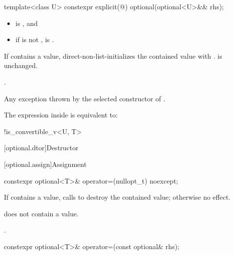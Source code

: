 %
\begin{itemdecl}
template<class U> constexpr explicit(@\seebelow@) optional(optional<U>&& rhs);
\end{itemdecl}

\begin{itemdescr}
\pnum
\constraints
\begin{itemize}
\item {} is , and
\item if  is not \cv{} ,
 is .
\end{itemize}

\pnum
\effects
If  contains a value,
direct-non-list-initializes the contained value with .
 is unchanged.

\pnum
\ensures
{}.

\pnum
\throws
Any exception thrown by the selected constructor of .

\pnum
\remarks
The expression inside  is equivalent to:
\begin{codeblock}
!is_convertible_v<U, T>
\end{codeblock}
\end{itemdescr}

[optional.dtor]{Destructor}

[optional.assign]{Assignment}

%
\begin{itemdecl}
constexpr optional<T>& operator=(nullopt_t) noexcept;
\end{itemdecl}

\begin{itemdescr}
\pnum
\effects
If  contains a value, calls  to destroy the contained value; otherwise no effect.

\pnum
\ensures
{} does not contain a value.

\pnum
\returns
{}.
\end{itemdescr}

%
\begin{itemdecl}
constexpr optional<T>& operator=(const optional& rhs);
\end{itemdecl}

